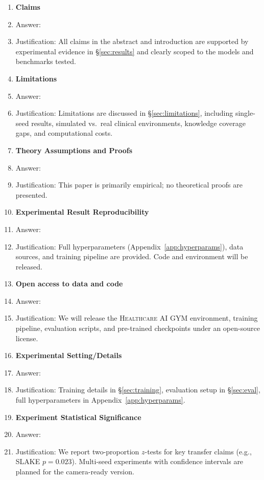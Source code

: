\documentclass{article}
\newcommand{\gym}{\textsc{Healthcare AI GYM}}
\begin{document}
\begin{enumerate}

\item {\bf Claims}
    \item[] Answer: \answerYes{}
    \item[] Justification: All claims in the abstract and introduction are supported by experimental evidence in \S\ref{sec:results} and clearly scoped to the models and benchmarks tested.

\item {\bf Limitations}
    \item[] Answer: \answerYes{}
    \item[] Justification: Limitations are discussed in \S\ref{sec:limitations}, including single-seed results, simulated vs.\ real clinical environments, knowledge coverage gaps, and computational costs.

\item {\bf Theory Assumptions and Proofs}
    \item[] Answer: \answerNA{}
    \item[] Justification: This paper is primarily empirical; no theoretical proofs are presented.

    \item {\bf Experimental Result Reproducibility}
    \item[] Answer: \answerYes{}
    \item[] Justification: Full hyperparameters (Appendix~\ref{app:hyperparams}), data sources, and training pipeline are provided. Code and environment will be released.

\item {\bf Open access to data and code}
    \item[] Answer: \answerYes{}
    \item[] Justification: We will release the \gym{} environment, training pipeline, evaluation scripts, and pre-trained checkpoints under an open-source license.

\item {\bf Experimental Setting/Details}
    \item[] Answer: \answerYes{}
    \item[] Justification: Training details in \S\ref{sec:training}, evaluation setup in \S\ref{sec:eval}, full hyperparameters in Appendix~\ref{app:hyperparams}.

\item {\bf Experiment Statistical Significance}
    \item[] Answer: \answerYes{}
    \item[] Justification: We report two-proportion $z$-tests for key transfer claims (e.g., SLAKE $p{=}0.023$). Multi-seed experiments with confidence intervals are planned for the camera-ready version.


\end{enumerate}
\end{document}

